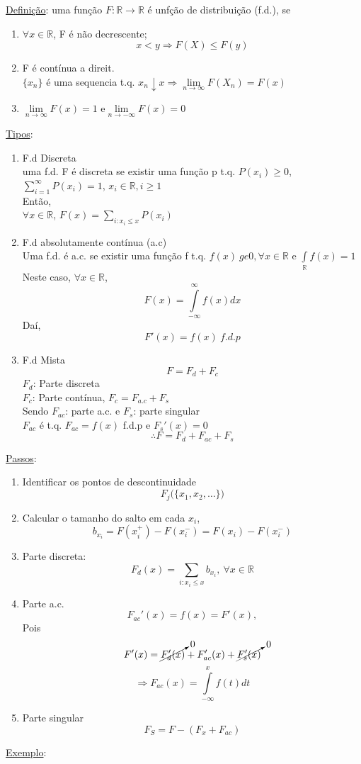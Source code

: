 \documentclass[a4paper,12pt]{article}
\begin{document}
\underline{Definição}: uma função $F:\mathbb R \longrightarrow \mathbb R $ é unfção de distribuição (f.d.), se 
\begin{enumerate}
	\item $\forall x \in \mathbb R$, F é não decrescente;
	$$x<y \Rightarrow F(X)\le F(y) $$
	\item F é contínua a direit.\\
	$\{x_n\}$ é uma sequencia t.q. $x_n \downarrow x\Rightarrow \lim\limits_{n\rightarrow \infty}  F(X_n)=F(x)  $
	\item 
	$\lim\limits_{n\rightarrow \infty} F(x)=1$ e$ \lim\limits_{n\rightarrow -\infty} F(x)=0$
\end{enumerate}
\underline{Tipos}:\\
\begin{enumerate}
	\item F.d Discreta\\
	uma f.d. F é discreta se existir uma função p t.q.
	$P(x_i)\ge 0 $,  $\sum\limits_{i=1}^{\infty}P(x_i)=1$, $x_i\in \mathbb{R}, i\ge 1$\\
	Então,\\
	$\forall x\in \mathbb R$, $F(x) = \sum\limits _{i:x_i\le x}P(x_i)$
	
	\item F.d absolutamente contínua  (a.c)\\
	Uma f.d. é a.c. se existir uma função f t.q. $f(x)\ ge 0, \forall x \in \mathbb R$ e $\int\limits_{\mathbb R}f(x)=1$ \\
	Neste caso,
	$\forall x \in \mathbb R $,
	$$F(x) = \int\limits_{-\infty}^{\infty}f(x)dx $$
	Daí,
	$$F'(x)= f(x) \ f.d.p$$
	\item F.d Mista 
	$$F=F_d+F_c $$
	$F_d $: Parte discreta\\
		$F_c $: Parte contínua, $F_c=F_{a.c}+F_s$\\
		Sendo $F_{ac}$: parte a.c. e $F_s$: parte singular\\
		$F_{ac}$ é t.q. $F_{ac}=f(x)$ f.d.p e $F_s'(x)=0$
		$$\therefore F=F_d+F_{ac}+F_s $$
\end{enumerate}
\newpage
\underline{Passos}:
\begin{enumerate}
	\item Identificar os pontos de descontinuidade 
	$$F_j\bigg( \{x_1,x_2,\ldots \}\bigg) $$
	
	\item Calcular o tamanho do salto em cada $x_i$,
	$$b_{x_i}= F(x_i^+) - F(x_i^-) = F(x_i)-F(x_i^-)$$
	
	\item Parte discreta:
	$$F_d(x)=\sum\limits_{i:x_i\le x} b_{x_i}, \ \forall x\in \mathbb R $$
	\item Parte a.c.
	$$F_{ac}'(x)=f(x)=F'(x), $$
Pois $$F'(x)=\cancelto{0}{F_d'(x)}+F'_{ac}(x)+\cancelto{0}{F'_s(x)} $$	
$$\Rightarrow F_{ac}(x)=\int\limits_{-\infty}^{x} f(t)dt$$

\item Parte singular
$$F_S=F-(F_x+F_{ac}) $$
\end{enumerate}
\newpage
\underline{Exemplo}:\\
\end{document}
